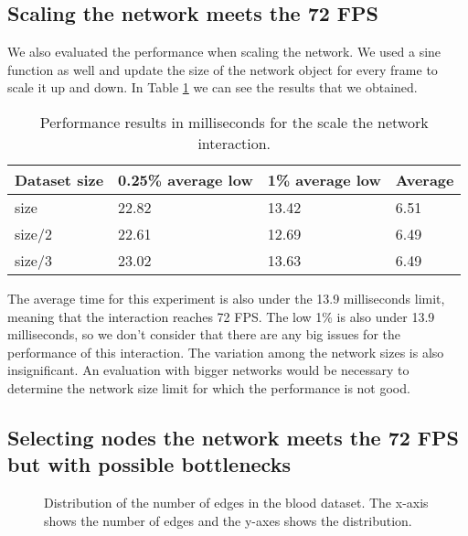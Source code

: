 \subsection{Scaling the network meets the 72 FPS}
We also evaluated the performance when scaling the network. We used a sine function as well and update the size of the network object for every frame to scale it up and down. In Table \ref{tab:experiment_scale} we can see the results that we obtained.

\begin{table}[h!]
\centering
\begin{tabular}{llll}
\hline
Dataset size & 0.25\% average low & 1\% average low & Average \\
\hline
size & 22.82 & 13.42 & 6.51 \\
size/2 & 22.61 & 12.69 & 6.49 \\
size/3 & 23.02 & 13.63 & 6.49 \\
\end{tabular}
\caption{Performance results in milliseconds for the scale the network interaction.}
\label{tab:experiment_scale}
\end{table}

The average time for this experiment is also under the 13.9 milliseconds limit, meaning that the interaction reaches 72 FPS. The low 1\% is also under 13.9 milliseconds, so we don't consider that there are any big issues for the performance of this interaction. The variation among the network sizes is also insignificant. An evaluation with bigger networks would be necessary to determine the network size limit for which the performance is not good.

\subsection{Selecting nodes the network meets the 72 FPS but with possible bottlenecks}

\begin{figure}[h!]
  \centering
  \begin{minipage}{.8\textwidth}
  \end{minipage}
  \caption{Distribution of the number of edges in the blood dataset. The x-axis shows the number of edges and the y-axes shows the distribution.}
  \label{fig:edges_nodes_blood}
\end{figure}


